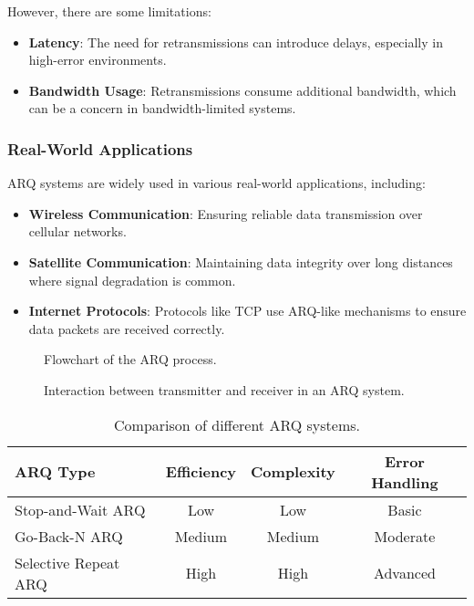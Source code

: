 However, there are some limitations:
\begin{itemize}
    \item \textbf{Latency}: The need for retransmissions can introduce delays, especially in high-error environments.
    \item \textbf{Bandwidth Usage}: Retransmissions consume additional bandwidth, which can be a concern in bandwidth-limited systems.
\end{itemize}

\subsubsection*{Real-World Applications}
ARQ systems are widely used in various real-world applications, including:
\begin{itemize}
    \item \textbf{Wireless Communication}: Ensuring reliable data transmission over cellular networks.
    \item \textbf{Satellite Communication}: Maintaining data integrity over long distances where signal degradation is common.
    \item \textbf{Internet Protocols}: Protocols like TCP use ARQ-like mechanisms to ensure data packets are received correctly.
\end{itemize}

\begin{figure}[h!]
    \centering
    \caption{Flowchart of the ARQ process.}
    \label{fig:arq-flowchart}
\end{figure}

\begin{figure}[h!]
    \centering
    \caption{Interaction between transmitter and receiver in an ARQ system.}
    \label{fig:arq-interaction}
\end{figure}

\begin{table}[h!]
    \centering
    \begin{tabular}{|l|c|c|c|}
        \hline
        \textbf{ARQ Type} & \textbf{Efficiency} & \textbf{Complexity} & \textbf{Error Handling} \\
        \hline
        Stop-and-Wait ARQ & Low & Low & Basic \\
        Go-Back-N ARQ & Medium & Medium & Moderate \\
        Selective Repeat ARQ & High & High & Advanced \\
        \hline
    \end{tabular}
    \caption{Comparison of different ARQ systems.}
    \label{tab:arq-comparison}
\end{table}

